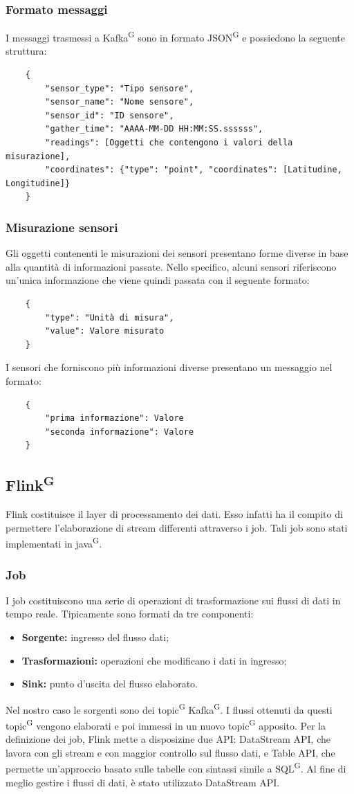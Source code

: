 \documentclass[8pt]{article}
\newcommand{\glossterm}[1]{#1\textsuperscript{G}} %
\begin{document}
\subsubsection{Formato messaggi}
I messaggi trasmessi a \glossterm{Kafka} sono in formato \glossterm{JSON} e possiedono la seguente struttura:
\begin{verbatim}
    {
        "sensor_type": "Tipo sensore",
        "sensor_name": "Nome sensore",
        "sensor_id": "ID sensore",
        "gather_time": "AAAA-MM-DD HH:MM:SS.ssssss",
        "readings": [Oggetti che contengono i valori della misurazione],
        "coordinates": {"type": "point", "coordinates": [Latitudine, Longitudine]}
    }
\end{verbatim}
\subsubsection{Misurazione sensori}
Gli oggetti contenenti le misurazioni dei sensori presentano forme diverse in base alla quantità di informazioni passate. Nello specifico, alcuni sensori riferiscono un'unica informazione che viene quindi passata con il seguente formato:
\begin{verbatim}
    {
        "type": "Unità di misura", 
        "value": Valore misurato
    }
\end{verbatim}
I sensori che forniscono più informazioni diverse presentano un messaggio nel formato:
\begin{verbatim}
    {
        "prima informazione": Valore
        "seconda informazione": Valore
    }
\end{verbatim}
\clearpage
\subsection{\glossterm{Flink}}
Flink costituisce il layer di processamento dei dati. Esso infatti ha il compito di permettere l'elaborazione di stream differenti attraverso i job.  Tali job sono stati implementati in \glossterm{java}.
\subsubsection{Job}
I job costituiscono una serie di operazioni di trasformazione sui flussi di dati in tempo reale. Tipicamente sono formati da tre componenti:
\begin{itemize}
	\setlength\itemsep{0em}
    \item \textbf{Sorgente:} ingresso del flusso dati;
    \item \textbf{Trasformazioni:} operazioni che modificano i dati in ingresso;
    \item \textbf{Sink:} punto d'uscita del flusso elaborato.
\end{itemize}
Nel nostro caso le sorgenti sono dei \glossterm{topic} \glossterm{Kafka}. I flussi ottenuti da questi \glossterm{topic} vengono elaborati e poi immessi in un nuovo \glossterm{topic} apposito.
Per la definizione dei job, Flink mette a disposizine due API: DataStream API, che lavora con gli stream e con maggior controllo sul flusso dati, e Table API, che permette un'approccio basato sulle tabelle con sintassi simile a \glossterm{SQL}.
Al fine di meglio gestire i flussi di dati, è stato utilizzato DataStream API.
\end{document}
